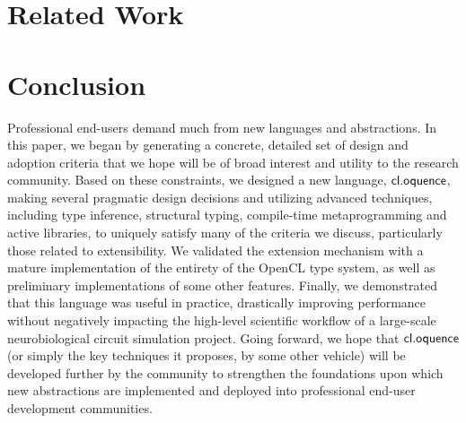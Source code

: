 \documentclass[10pt, conference, compsocconf]{IEEEtran}
\begin{document}
\section{Related Work}

\section{Conclusion}
Professional end-users demand much from new languages and abstractions. In this paper, we began by generating a concrete, detailed set of design and adoption criteria that we hope will be of broad interest and utility to the research community. Based on these constraints, we designed a new language, $\textsf{cl.oquence}$, making several pragmatic design decisions and utilizing advanced techniques, including type inference, structural typing, compile-time metaprogramming and active libraries, to uniquely satisfy many of the criteria we discuss, particularly those related to extensibility. We validated the extension mechanism with a mature implementation of  the entirety of the OpenCL type system, as well as preliminary implementations of some other features. Finally, we demonstrated that this language was useful in practice, drastically improving performance without negatively impacting the high-level scientific workflow of a large-scale neurobiological circuit simulation project. Going forward, we hope that $\textsf{cl.oquence}$ (or simply the key techniques it proposes, by some other vehicle) will be developed further by the community to strengthen the foundations upon which new abstractions are implemented and deployed into professional end-user development communities.

%
%
\end{document}
